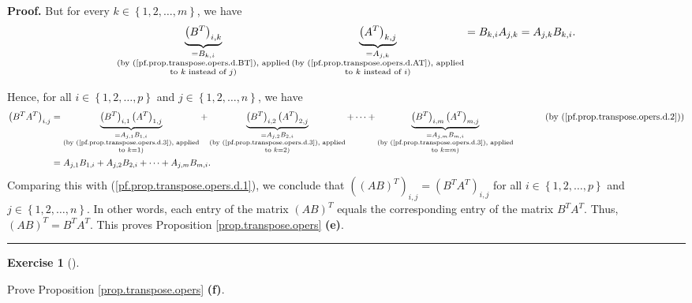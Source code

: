 \documentclass[numbers=enddot,12pt,final,onecolumn,notitlepage]{scrartcl}%
\theoremstyle{definition}
\newtheorem{exmp}[theo]{Exercise}
\newenvironment{exercise}[1][]
{\begin{exmp}[#1]\begin{leftbar}}
{\end{leftbar}\end{exmp}}
\newenvironment{proof}[1][Proof]{\noindent\textbf{#1.} }{\ \rule{0.5em}{0.5em}}
\begin{document}
\begin{proof}
But for every $k\in\left\{  1,2,\ldots,m\right\}  $, we have%
\begin{equation}
\underbrace{\left(  B^{T}\right)  _{i,k}}_{\substack{=B_{k,i}\\\text{(by
(\ref{pf.prop.transpose.opers.d.BT}), applied}\\\text{to }k\text{ instead of
}j\text{)}}}\underbrace{\left(  A^{T}\right)  _{k,j}}_{\substack{=A_{j,k}%
\\\text{(by (\ref{pf.prop.transpose.opers.d.AT}), applied}\\\text{to }k\text{
instead of }i\text{)}}}=B_{k,i}A_{j,k}=A_{j,k}B_{k,i}.
\label{pf.prop.transpose.opers.d.3}%
\end{equation}


Hence, for all $i\in\left\{  1,2,\ldots,p\right\}  $ and $j\in\left\{
1,2,\ldots,n\right\}  $, we have
\begin{align*}
\left(  B^{T}A^{T}\right)  _{i,j}  &  =\underbrace{\left(  B^{T}\right)
_{i,1}\left(  A^{T}\right)  _{1,j}}_{\substack{=A_{j,1}B_{1,i}\\\text{(by
(\ref{pf.prop.transpose.opers.d.3}), applied}\\\text{to }k=1\text{)}%
}}+\underbrace{\left(  B^{T}\right)  _{i,2}\left(  A^{T}\right)  _{2,j}%
}_{\substack{=A_{j,2}B_{2,i}\\\text{(by (\ref{pf.prop.transpose.opers.d.3}),
applied}\\\text{to }k=2\text{)}}}+\cdots+\underbrace{\left(  B^{T}\right)
_{i,m}\left(  A^{T}\right)  _{m,j}}_{\substack{=A_{j,m}B_{m,i}\\\text{(by
(\ref{pf.prop.transpose.opers.d.3}), applied}\\\text{to }k=m\text{)}%
}}\ \ \ \ \ \ \ \ \ \ \left(  \text{by (\ref{pf.prop.transpose.opers.d.2}%
)}\right) \\
&  =A_{j,1}B_{1,i}+A_{j,2}B_{2,i}+\cdots+A_{j,m}B_{m,i}.
\end{align*}
Comparing this with (\ref{pf.prop.transpose.opers.d.1}), we conclude that
$\left(  \left(  AB\right)  ^{T}\right)  _{i,j}=\left(  B^{T}A^{T}\right)
_{i,j}$ for all $i\in\left\{  1,2,\ldots,p\right\}  $ and $j\in\left\{
1,2,\ldots,n\right\}  $. In other words, each entry of the matrix $\left(
AB\right)  ^{T}$ equals the corresponding entry of the matrix $B^{T}A^{T}$.
Thus, $\left(  AB\right)  ^{T}=B^{T}A^{T}$. This proves Proposition
\ref{prop.transpose.opers} \textbf{(e)}.
\end{proof}

\begin{exercise}
\label{exe.prop.transpose.opers.e}Prove Proposition \ref{prop.transpose.opers}
\textbf{(f)}.
\end{exercise}
\end{document}
